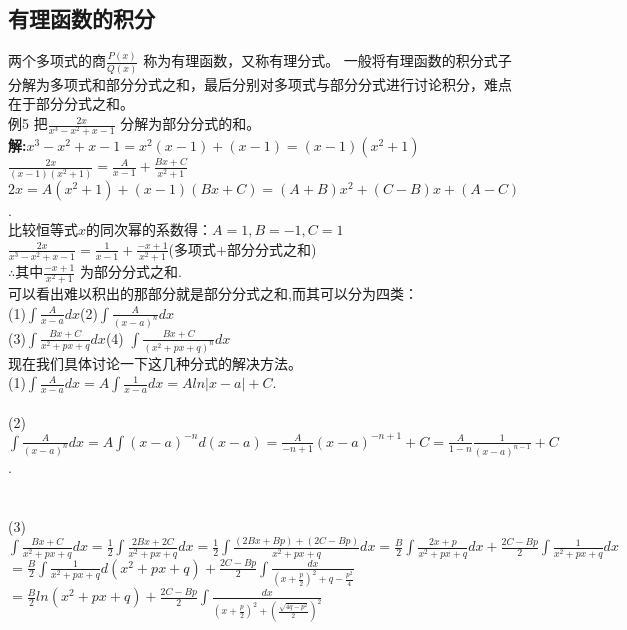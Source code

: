 \documentclass[UTF8]{ctexart}
\begin{document}
\vspace{-4mm} \subsection{有理函数的积分}  \vspace{-2mm} \small 两个多项式的商$\displaystyle{\frac{P(x)}{Q(x)}}$ 称为有理函数，又称有理分式。 一般将有理函数的积分式子分解为多项式和部分分式之和，最后分别对多项式与部分分式进行讨论积分，难点在于部分分式之和。
\\ 例5 把$\displaystyle{\frac{2x}{x^3-x^2+x-1}}$ 分解为部分分式的和。
\\ \textbf{解:}$x^3-x^2+x-1=x^2(x-1)+(x-1)=(x-1)(x^2+1)$
\\ $\displaystyle{\frac{2x}{(x-1)(x^2+1)}=\frac{A}{x-1}+\frac{Bx+C}{x^2+1}}$
\\ $2x=A(x^2+1)+(x-1)(Bx+C)=(A+B)x^2+(C-B)x+(A-C)$.
\\ 比较恒等式$x$的同次幂的系数得：$A=1,B=-1,C=1$
\\ $\displaystyle{\frac{2x}{x^3-x^2+x-1}=\frac{1}{x-1}+\frac{-x+1}{x^2+1}}$(多项式+部分分式之和)
\\ $\therefore $其中$\displaystyle{\frac{-x+1}{x^2+1}}$ 为部分分式之和.
\\ 可以看出难以积出的那部分就是部分分式之和,而其可以分为四类：
\\ (1)$\displaystyle{\int \frac{A}{x-a}dx}$\quad (2)$\displaystyle{\int \frac{A}{(x-a)^n}dx}$
\\ (3)$\displaystyle{\int \frac{Bx+C}{x^2+px+q}dx }$\quad(4) $\displaystyle{\int \frac{Bx+C}{(x^2+px+q)^n}dx}$
\\ 现在我们具体讨论一下这几种分式的解决方法。
\\ (1)$\displaystyle{\int \frac{A}{x-a}dx=A\int \frac{1}{x-a}dx=Aln|x-a|+C}$.
\\ \\(2)$\displaystyle{\int \frac{A}{(x-a)^n}dx=A\int (x-a)^{-n}d(x-a)=\frac{A}{-n+1}(x-a)^{-n+1}+C=\frac{A}{1-n}\frac{1}{(x-a)^{n-1}}+C}$.
\\ \\ \\(3)$\displaystyle{\int \frac{Bx+C}{x^2+px+q}dx=\frac{1}{2}\int \frac{2Bx+2C}{x^2+px+q}dx=\frac{1}{2}\int \frac{(2Bx+Bp)+(2C-Bp)}{x^2+px+q}dx=\frac{B}{2}\int \frac{2x+p}{x^2+px+q}dx+\frac{2C-Bp}{2}\int \frac{1}{x^2+px+q}dx}$
\\ $\displaystyle{=\frac{B}{2}\int \frac{1}{x^2+px+q}d(x^2+px+q)+\frac{2C-Bp}{2}\int \frac{dx}{(x+\frac{p}{2})^2+q-\frac{p^2}{4}}}$
\\ $=\displaystyle{\frac{B}{2}ln(x^2+px+q)+\frac{2C-Bp}{2}\int \frac{dx}{(x+\frac{p}{2})^2+(\frac{\sqrt{4q-p^2}}{2})^2}}$
\end{document}
